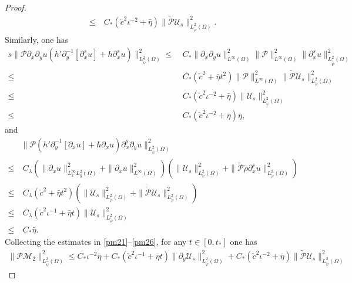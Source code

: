 \documentclass{amsart}
\numberwithin{equation}{section}
\begin{document}
\begin{proof}
\begin{align}
\leq&~C_{*}(\check{c}^{2}\iota^{-2}+\bar{\eta})\|\tilde{\mathcal{P}}\mathcal{U}_{s}\|_{L_{\tilde{\varphi}}^{2}(\Omega)}^{2}.\nonumber
\end{align}
Similarly, one has
\begin{align}\label{pm25}
s\|\mathcal{P}\partial_{x}\partial_{y}u(h'\partial_{y}^{-1}[\partial_{x}^{s}u]+h\partial_{x}^{s}u)\|_{L_{\hat{\psi}}^{2}(\Omega)}^{2}
\leq&~C_{*}\|\partial_{x}\partial_{y}u\|_{L^{\infty}(\Omega)}^{2}
        \|\mathcal{P}\|_{L^{\infty}(\Omega)}^{2}\|\partial_{x}^{s}u\|_{L_{\tilde{\hat{\Psi}}}^{2}(\Omega)}^{2}\\
\leq&~C_{*}(\check{c}^{2}+\bar{\eta}t^{2})\|\mathcal{P}\|_{L^{\infty}(\Omega)}^{2}\|\tilde{\mathcal{P}}\mathcal{U}_{s}\|_{L_{\tilde{\varphi}}^{2}(\Omega)}^{2}\nonumber\\
\leq&~C_{*}(\check{c}^{2}\iota^{-2}+\bar{\eta})\|\mathcal{U}_{s}\|_{L_{\tilde{\varphi}}^{2}(\Omega)}^{2}\nonumber\\
\leq&~C_{*}(\check{c}^{2}\iota^{-2}+\bar{\eta})\bar{\eta},\nonumber
\end{align}
and
\begin{align}\label{pm26}
&\|\mathcal{P}(h'\partial_{y}^{-1}[\partial_{x}u]+h\partial_{x}u)\partial_{x}^{s}\partial_{y}u\|_{L_{\hat{\psi}}^{2}(\Omega)}^{2}\\
\leq&~C_{\lambda}\left(\|\partial_{x}u\|_{L_{x}^{\infty}L_{y}^{2}(\Omega)}^{2}+\|\partial_{x}u\|_{L^{\infty}(\Omega)}^{2}\right)
       \left(\|\mathcal{U}_{s}\|_{L_{\tilde{\varphi}}^{2}(\Omega)}^{2}+\|\tilde{\mathcal{P}}\tilde{\rho}\partial_{x}^{s}u\|_{L_{\tilde{\varphi}}^{2}(\Omega)}^{2}\right)\nonumber\\
\leq&~C_{\lambda}(\check{c}^{2}+\bar{\eta}t^{2})
       \left(\|\mathcal{U}_{s}\|_{L_{\tilde{\varphi}}^{2}(\Omega)}^{2}+\|\tilde{\mathcal{P}}\mathcal{U}_{s}\|_{L_{\tilde{\varphi}}^{2}(\Omega)}^{2}\right)\nonumber\\
\leq&~C_{\lambda}(\check{c}^{2}\iota^{-1}+\bar{\eta}t)\|\mathcal{U}_{s}\|_{L_{\tilde{\varphi}}^{2}(\Omega)}^{2}\nonumber\\
\leq&~C_{*}\bar{\eta}.\nonumber
\end{align}
Collecting the estimates in \eqref{pm21}--\eqref{pm26}, for any $t\in[0,t_{*}]$ one has
\begin{align*}
\|\mathcal{P}\mathcal{M}_{2}\|_{L_{\hat{\psi}}^{2}(\Omega)}^{2}
\leq C_{*}\iota^{-2}\bar{\eta}
    +C_{*}(\check{c}^{2}\iota^{-1}+\bar{\eta}t)\|\partial_{y}\mathcal{U}_{s}\|_{L_{\tilde{\varphi}}^{2}(\Omega)}^{2}
    +C_{*}(\check{c}^{2}\iota^{-2}+\bar{\eta})\|\tilde{\mathcal{P}}\mathcal{U}_{s}\|_{L_{\tilde{\varphi}}^{2}(\Omega)}^{2}

\end{align*}
\end{proof}
\end{document}
